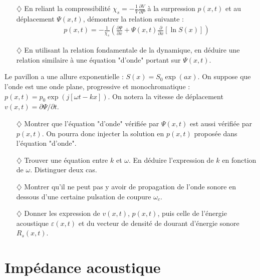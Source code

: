\documentclass{report}
\begin{document}
\begin{itemize}

\item[$\diamondsuit$] En reliant la compressibilité $\chi_s=-\frac{1}{V}\frac{\partial V}{\partial P}$ à la surpression $p(x,t)$ et au déplacement $\Psi(x,t)$, démontrer la relation suivante :
\begin{align*}
	p(x,t) = -\frac{1}{\chi_s}\left(\frac{\partial \Psi}{\partial x}+\Psi(x,t)\frac{\partial }{\partial x}\left[\ln S(x) \right]  \right)
\end{align*}

\item[$\diamondsuit$] En utilisant la relation fondamentale de la dynamique, en déduire une relation similaire à une équation "d'onde" portant sur $\Psi(x,t)$.

\end{itemize}

Le pavillon a une allure exponentielle : $S(x)=S_0\exp(ax)$. On suppose que l'onde est une onde plane, progressive et monochromatique : $p(x,t)=p_0\exp\left(j[\omega t-kx] \right)$. On notera la vitesse de déplacement $v(x,t)=\partial\Psi/\partial t$.

\begin{itemize}

\item[$\diamondsuit$] Montrer que l'équation "d'onde" vérifiée par $\Psi(x,t)$ est aussi vérifiée par $p(x,t)$. On pourra donc injecter la solution en $p(x,t)$ proposée dans l'équation "d'onde".

\item[$\diamondsuit$]  Trouver une équation entre $k$ et $\omega$. En déduire l'expression de $k$ en fonction de $\omega$. Distinguer deux cas.

\item[$\diamondsuit$] Montrer qu'il ne peut pas y avoir de propagation de l'onde sonore en dessous d'une certaine pulsation de coupure $\omega_c$.

\item[$\diamondsuit$] Donner les expression de $v(x,t)$, $p(x,t)$, puis celle de l'énergie acoustique $\varepsilon(x,t)$ et du vecteur de densité de dourant d'énergie sonore $R_s(x,t)$.

\end{itemize}

\newpage

\section*{Impédance acoustique}
\end{document}
